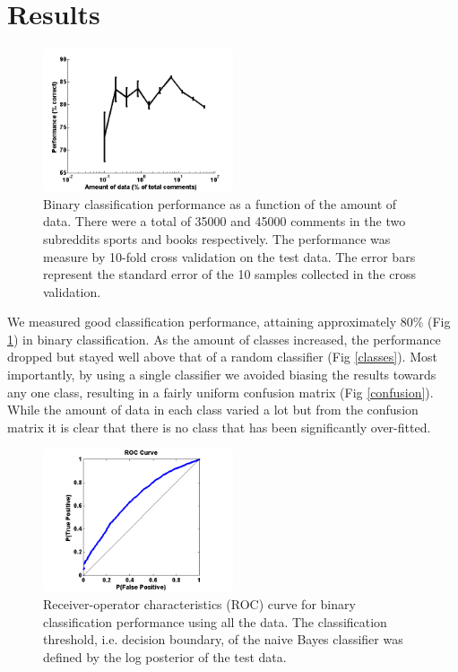 \documentclass[10pt,twocolumn]{article}
\begin{document}
\section{Results}
\begin{figure}
    \centering
  	\includegraphics[width=0.5\textwidth]{./binary_data.png}
  \caption{ Binary classification performance as a function of the amount of data. There were a total of 35000 and 45000 comments in the two subreddits sports and books respectively. The performance was measure by 10-fold cross validation on the test data. The error bars represent the standard error of the 10 samples collected in the cross validation.}
  	\label{multiclass}
    \end{figure}
We measured good classification performance, attaining approximately $80\%$ (Fig \ref{multiclass}) in binary classification. As the amount of classes increased, the performance dropped but stayed well above that of a random classifier (Fig \ref{classes}). Most importantly, by using a single classifier we avoided biasing the results towards any one class, resulting in a fairly uniform confusion matrix (Fig \ref{confusion}). While the amount of data in each class varied a lot but from the confusion matrix it is clear that there is no class that has been significantly over-fitted.


\begin{figure}
    \centering
  	\includegraphics[width=0.5\textwidth]{./roc.png}
  	\caption{Receiver-operator characteristics (ROC) curve for binary classification performance using all the data. The classification threshold, i.e. decision boundary, of the naive Bayes classifier was defined by the log posterior of the test data.}
  	\label{roc}
\end{figure}		
\end{document}
